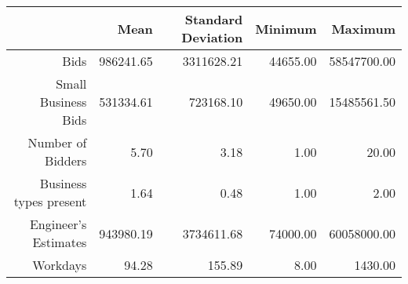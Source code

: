 \begin{table}[ht]
\begin{tabular}{rrrrr}
  \toprule
 & Mean & Standard Deviation & Minimum & Maximum \\ 
  \midrule
Bids & 986241.65 & 3311628.21 & 44655.00 & 58547700.00 \\ 
  Small Business Bids & 531334.61 & 723168.10 & 49650.00 & 15485561.50 \\ 
  Number of Bidders & 5.70 & 3.18 & 1.00 & 20.00 \\ 
  Business types present & 1.64 & 0.48 & 1.00 & 2.00 \\ 
  Engineer's Estimates & 943980.19 & 3734611.68 & 74000.00 & 60058000.00 \\ 
  Workdays & 94.28 & 155.89 & 8.00 & 1430.00 \\ 
   \bottomrule
\end{tabular}
\end{table}
